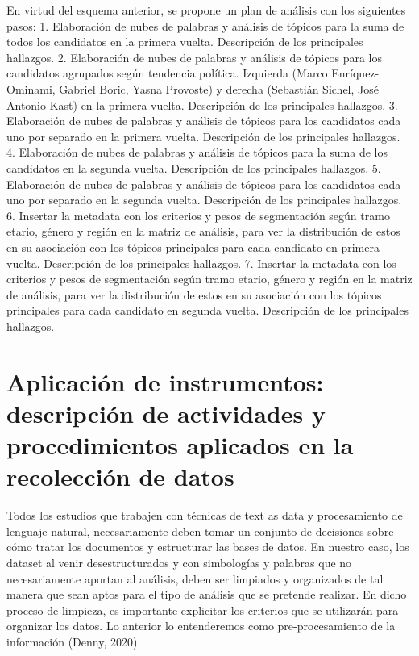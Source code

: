 \documentclass[
  10pt,
  letterpaper,
]{report}
\begin{document}
En virtud del esquema anterior, se propone un plan de análisis con los
siguientes pasos: 1. Elaboración de nubes de palabras y análisis de
tópicos para la suma de todos los candidatos en la primera vuelta.
Descripción de los principales hallazgos. 2. Elaboración de nubes de
palabras y análisis de tópicos para los candidatos agrupados según
tendencia política. Izquierda (Marco Enríquez-Ominami, Gabriel Boric,
Yasna Provoste) y derecha (Sebastián Sichel, José Antonio Kast) en la
primera vuelta. Descripción de los principales hallazgos. 3. Elaboración
de nubes de palabras y análisis de tópicos para los candidatos cada uno
por separado en la primera vuelta. Descripción de los principales
hallazgos. 4. Elaboración de nubes de palabras y análisis de tópicos
para la suma de los candidatos en la segunda vuelta. Descripción de los
principales hallazgos. 5. Elaboración de nubes de palabras y análisis de
tópicos para los candidatos cada uno por separado en la segunda vuelta.
Descripción de los principales hallazgos. 6. Insertar la metadata con
los criterios y pesos de segmentación según tramo etario, género y
región en la matriz de análisis, para ver la distribución de estos en su
asociación con los tópicos principales para cada candidato en primera
vuelta. Descripción de los principales hallazgos. 7. Insertar la
metadata con los criterios y pesos de segmentación según tramo etario,
género y región en la matriz de análisis, para ver la distribución de
estos en su asociación con los tópicos principales para cada candidato
en segunda vuelta. Descripción de los principales hallazgos.

\hypertarget{aplicaciuxf3n-de-instrumentos-descripciuxf3n-de-actividades-y-procedimientos-aplicados-en-la-recolecciuxf3n-de-datos}{%
\section{Aplicación de instrumentos: descripción de actividades y
procedimientos aplicados en la recolección de
datos}\label{aplicaciuxf3n-de-instrumentos-descripciuxf3n-de-actividades-y-procedimientos-aplicados-en-la-recolecciuxf3n-de-datos}}

Todos los estudios que trabajen con técnicas de text as data y
procesamiento de lenguaje natural, necesariamente deben tomar un
conjunto de decisiones sobre cómo tratar los documentos y estructurar
las bases de datos. En nuestro caso, los dataset al venir
desestructurados y con simbologías y palabras que no necesariamente
aportan al análisis, deben ser limpiados y organizados de tal manera que
sean aptos para el tipo de análisis que se pretende realizar. En dicho
proceso de limpieza, es importante explicitar los criterios que se
utilizarán para organizar los datos. Lo anterior lo entenderemos como
pre-procesamiento de la información (Denny, 2020).
\end{document}
